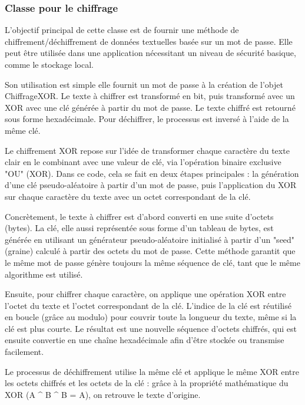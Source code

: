 \documentclass[main.tex]{subfiles}
\begin{document}
\subsubsection{Classe pour le chiffrage}

L’objectif principal de cette classe est de fournir une méthode de chiffrement/déchiffrement de données textuelles basée sur un mot de passe. Elle peut être utilisée dans une application nécessitant un niveau de sécurité basique, comme le stockage local.  

 Son utilisation est simple elle fournit un mot de passe à la création de l’objet ChiffrageXOR. Le texte à chiffrer est transformé en bit, puis transformé avec un XOR avec une clé générée à partir du mot de passe. Le texte chiffré est retourné sous forme hexadécimale. Pour déchiffrer, le processus est inversé à l’aide de la même clé. 

Le chiffrement XOR repose sur l’idée de transformer chaque caractère du texte clair en le combinant avec une valeur de clé, via l’opération binaire exclusive "OU" (XOR). Dans ce code, cela se fait en deux étapes principales : la génération d’une clé pseudo-aléatoire à partir d’un mot de passe, puis l’application du XOR sur chaque caractère du texte avec un octet correspondant de la clé. 

Concrètement, le texte à chiffrer est d’abord converti en une suite d’octets (bytes). La clé, elle aussi représentée sous forme d’un tableau de bytes, est générée en utilisant un générateur pseudo-aléatoire initialisé à partir d’un "seed" (graine) calculé à partir des octets du mot de passe. Cette méthode garantit que le même mot de passe génère toujours la même séquence de clé, tant que le même algorithme est utilisé. 

Ensuite, pour chiffrer chaque caractère, on applique une opération XOR entre l’octet du texte et l’octet correspondant de la clé. L’indice de la clé est réutilisé en boucle (grâce au modulo) pour couvrir toute la longueur du texte, même si la clé est plus courte. Le résultat est une nouvelle séquence d’octets chiffrés, qui est ensuite convertie en une chaîne hexadécimale afin d’être stockée ou transmise facilement. 

Le processus de déchiffrement utilise la même clé et applique le même XOR entre les octets chiffrés et les octets de la clé : grâce à la propriété mathématique du XOR (A \^{} B \^{} B = A), on retrouve le texte d’origine. 
\end{document}
